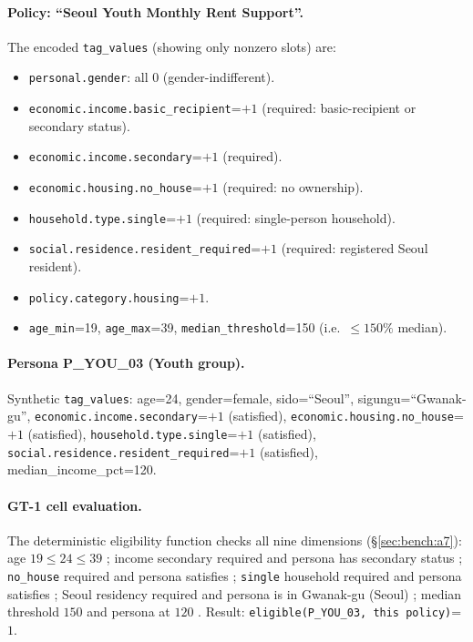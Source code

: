 \documentclass{article}
\begin{document}
\paragraph{Policy: ``Seoul Youth Monthly Rent Support''.}
The encoded \texttt{tag\_values} (showing only nonzero slots) are:
\begin{itemize}[leftmargin=*,nosep]
\item \texttt{personal.gender}: all $0$ (gender-indifferent).
\item \texttt{economic.income.basic\_recipient}{=}$+1$ (required:
      basic-recipient or secondary status).
\item \texttt{economic.income.secondary}{=}$+1$ (required).
\item \texttt{economic.housing.no\_house}{=}$+1$ (required: no
      ownership).
\item \texttt{household.type.single}{=}$+1$ (required: single-person
      household).
\item \texttt{social.residence.resident\_required}{=}$+1$ (required:
      registered Seoul resident).
\item \texttt{policy.category.housing}{=}$+1$.
\item \texttt{age\_min}{=}19, \texttt{age\_max}{=}39,
      \texttt{median\_threshold}{=}150 (i.e.\ $\leq{}150\%$ median).
\end{itemize}

\paragraph{Persona P\_YOU\_03 (Youth group).}
Synthetic \texttt{tag\_values}: age=24, gender=female, sido=``Seoul'',
sigungu=``Gwanak-gu'', \texttt{economic.income.secondary}{=}$+1$
(satisfied), \texttt{economic.housing.no\_house}{=}$+1$ (satisfied),
\texttt{household.type.single}{=}$+1$ (satisfied),
\texttt{social.residence.resident\_required}{=}$+1$ (satisfied),
median\_income\_pct=120.

\paragraph{GT-1 cell evaluation.}
The deterministic eligibility function checks all nine dimensions
(\S\ref{sec:bench:a7}): age $19\leq{}24\leq{}39$ \checkmark; income
secondary required and persona has secondary status \checkmark;
\texttt{no\_house} required and persona satisfies \checkmark;
\texttt{single} household required and persona satisfies \checkmark;
Seoul residency required and persona is in Gwanak-gu (Seoul)
\checkmark; median threshold $150$ and persona at $120$ \checkmark.
Result: \texttt{eligible(P\_YOU\_03, this policy)}{=}$1$.
\end{document}
